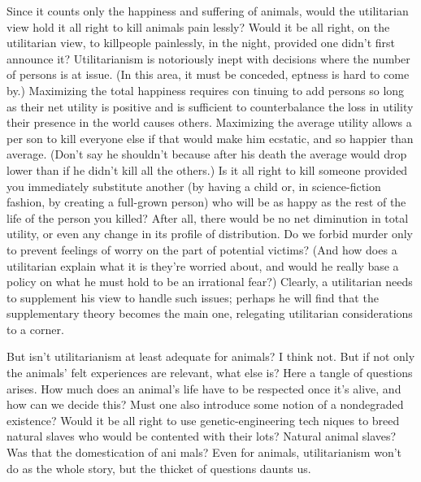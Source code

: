 \documentclass[11pt,openany]{book}
\begin{document}
Since it counts only the happiness and suffering of animals, would the utilitarian view hold it all right to kill animals pain lessly? Would it be all right, on the utilitarian view, to killpeople painlessly, in the night, provided one didn't first announce it? Utilitarianism is notoriously inept with decisions where the number of persons is at issue. (In this area, it must be conceded, eptness is hard to come by.) Maximizing the total happiness requires con tinuing to add persons so long as their net utility is positive and is sufficient to counterbalance the loss in utility their presence in the world causes others. Maximizing the average utility allows a per son to kill everyone else if that would make him ecstatic, and so happier than average. (Don't say he shouldn't because after his death the average would drop lower than if he didn't kill all the others.) Is it all right to kill someone provided you immediately substitute another (by having a child or, in science-fiction fashion, by creating a full-grown person) who will be as happy as the rest of the life of the person you killed? After all, there would be no net diminution in total utility, or even any change in its profile of distribution. Do we forbid murder only to prevent feelings of worry on the part of potential victims? (And how does a utilitarian explain what it is they're worried about, and would he really base a policy on what he must hold to be an irrational fear?) Clearly, a utilitarian needs to supplement his view to handle such issues; perhaps he will find that the supplementary theory becomes the main one, relegating utilitarian considerations to a corner. 

But isn't utilitarianism at least adequate for animals? I think not. But if not only the animals' felt experiences are relevant, what else is? Here a tangle of questions arises. How much does an animal's life have to be respected once it's alive, and how can we decide this? Must one also introduce some notion of a nondegraded existence? Would it be all right to use genetic-engineering tech niques to breed natural slaves who would be contented with their lots? Natural animal slaves? Was that the domestication of ani mals? Even for animals, utilitarianism won't do as the whole story, but the thicket of questions daunts us. 
\end{document}
